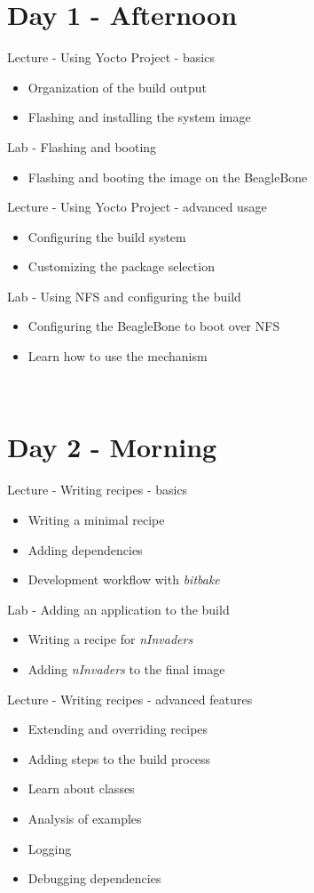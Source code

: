 \documentclass[a4paper,12pt,obeyspaces,spaces,hyphens]{article}
\begin{document}
\section{Day 1 - Afternoon}
\feagendatwocolumn
{Lecture - Using Yocto Project - basics}
{
  \begin{itemize}
  \item Organization of the build output
  \item Flashing and installing the system image
  \end{itemize}
}
{Lab - Flashing and booting}
{
  \begin{itemize}
  \item Flashing and booting the image on the BeagleBone
  \end{itemize}
}

\feagendatwocolumn
{Lecture - Using Yocto Project - advanced usage}
{
  \begin{itemize}
  \item Configuring the build system
  \item Customizing the package selection
  \end{itemize}
}
{Lab - Using NFS and configuring the build}
{
  \begin{itemize}
  \item Configuring the BeagleBone to boot over NFS
  \item Learn how to use the  mechanism
  \end{itemize}
}
\\
\section{Day 2 - Morning}

\feagendatwocolumn
{Lecture - Writing recipes - basics}
{
  \begin{itemize}
  \item Writing a minimal recipe
  \item Adding dependencies
  \item Development workflow with {\em bitbake}
  \end{itemize}
}
{Lab - Adding an application to the build}
{
  \begin{itemize}
  \item Writing a recipe for {\em nInvaders}
  \item Adding {\em nInvaders} to the final image
  \end{itemize}
}

\feagendaonecolumn
{Lecture - Writing recipes - advanced features}
{
  \begin{itemize}
  \item Extending and overriding recipes
  \item Adding steps to the build process
  \item Learn about classes
  \item Analysis of examples
  \item Logging
  \item Debugging dependencies
  \end{itemize}
}
\end{document}
